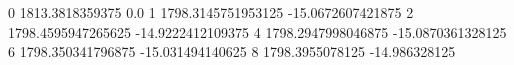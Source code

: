 0 1813.3818359375 0.0
1 1798.3145751953125 -15.0672607421875
2 1798.4595947265625 -14.9222412109375
4 1798.2947998046875 -15.0870361328125
6 1798.350341796875 -15.031494140625
8 1798.3955078125 -14.986328125
